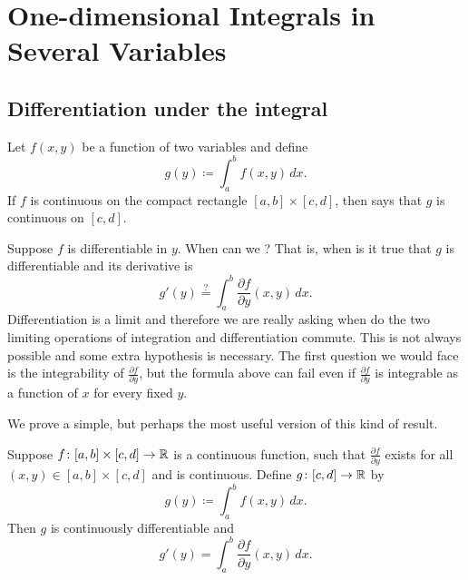 \chapter{One-dimensional Integrals in Several Variables} \label{path:chapter}


\section{Differentiation under the integral}
\label{sec:diffunderint}


Let $f(x,y)$ be a function of two variables and define
\begin{equation*}
g(y) \coloneqq \int_a^b f(x,y) \,dx .
\end{equation*}
If $f$ is continuous on the compact rectangle $[a,b] \times [c,d]$, then
says that $g$ is continuous on $[c,d]$.

Suppose $f$ is differentiable in $y$.  
When can we ?
That is, when is it true that $g$ is differentiable and its derivative is
\begin{equation*}
g'(y) \overset{?}{=} \int_a^b \frac{\partial f}{\partial y}(x,y) \,dx .
\end{equation*}
Differentiation is a limit and therefore we are really asking when do the
two limiting operations of integration and differentiation commute.
This is not always possible and some extra hypothesis is
necessary.  The first
question we would face is the integrability of
$\frac{\partial f}{\partial y}$, but the formula above can fail even if
$\frac{\partial f}{\partial y}$ is integrable as a function of $x$ for every
fixed $y$.

We prove a simple, but perhaps the most useful version of this kind of result.

\begin{thm}
Suppose $f \colon [a,b] \times [c,d] \to {\mathbb{R}}$ is a continuous function,
such that $\frac{\partial f}{\partial y}$ exists for all $(x,y) \in [a,b]
\times [c,d]$ and is continuous.  Define $g \colon [c,d] \to {\mathbb{R}}$ by
\begin{equation*}
g(y) \coloneqq \int_a^b f(x,y) \,dx .
\end{equation*}
Then $g$ is continuously differentiable and
\begin{equation*}
g'(y) = \int_a^b \frac{\partial f}{\partial y}(x,y) \,dx .
\end{equation*}
\end{thm}

